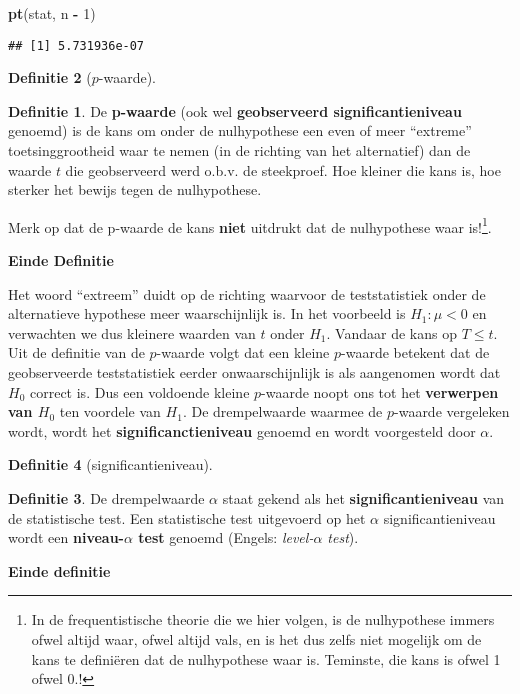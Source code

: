 \documentclass[
  12pt,dutch,coursenotes]{book}
\newenvironment{Shaded}{\begin{snugshade}}{\end{snugshade}}
\newcommand{\DecValTok}[1]{\textcolor[rgb]{0.00,0.00,0.81}{#1}}
\newcommand{\KeywordTok}[1]{\textcolor[rgb]{0.13,0.29,0.53}{\textbf{#1}}}
\newcommand{\NormalTok}[1]{#1}
\newcommand{\OperatorTok}[1]{\textcolor[rgb]{0.81,0.36,0.00}{\textbf{#1}}}
\newcommand{\StringTok}[1]{\textcolor[rgb]{0.31,0.60,0.02}{#1}}
\theoremstyle{definition}
\newtheorem{definition}{Definitie}[chapter]
\theoremstyle{definition}
\theoremstyle{definition}
\theoremstyle{remark}
\begin{document}
\begin{Shaded}
\begin{Highlighting}[]
\KeywordTok{pt}\NormalTok{(stat, n }\OperatorTok{{-}}\StringTok{ }\DecValTok{1}\NormalTok{)}
\end{Highlighting}
\end{Shaded}

\begin{verbatim}
## [1] 5.731936e-07
\end{verbatim}

\begin{definition}[$p$-waarde]
\begin{definition}

\protect\hypertarget{def:unnamed-chunk-163}{}{\label{def:unnamed-chunk-163} \iffalse (\(p\)-waarde) \fi{} }De \textbf{p-waarde} (ook wel \textbf{geobserveerd significantieniveau} genoemd) is de
kans om onder de nulhypothese een even of meer ``extreme'' toetsinggrootheid
waar te nemen (in de richting van het alternatief) dan de waarde \(t\) die
geobserveerd werd o.b.v. de steekproef. Hoe kleiner die kans is, hoe sterker het bewijs tegen de
nulhypothese.

Merk op dat de p-waarde de kans \textbf{niet} uitdrukt dat de nulhypothese waar is!\footnote{In de frequentistische theorie die we hier volgen, is de nulhypothese immers ofwel altijd waar, ofwel altijd vals, en is het dus zelfs niet mogelijk om de kans te definiëren dat de nulhypothese waar is. Teminste, die kans is ofwel 1 ofwel 0.!}.

\textbf{Einde Definitie}

\end{definition}
\end{definition}

Het woord ``extreem'' duidt op de richting waarvoor de teststatistiek onder de alternatieve hypothese meer waarschijnlijk is. In het voorbeeld is \(H_1: \mu < 0\) en verwachten we dus kleinere waarden van \(t\) onder \(H_1\). Vandaar de kans op \(T\leq t\).
Uit de definitie van de \(p\)-waarde volgt dat een kleine \(p\)-waarde betekent dat de geobserveerde teststatistiek eerder onwaarschijnlijk is als aangenomen wordt dat \(H_0\) correct is.
Dus een voldoende kleine \(p\)-waarde noopt ons tot het \textbf{verwerpen van \(H_0\)} ten voordele van \(H_1\).
De drempelwaarde waarmee de \(p\)-waarde vergeleken wordt, wordt het \textbf{significanctieniveau} genoemd en wordt voorgesteld door \(\alpha\).

\begin{definition}[significantieniveau]
\begin{definition}

\protect\hypertarget{def:unnamed-chunk-164}{}{\label{def:unnamed-chunk-164} \iffalse (significantieniveau) \fi{} }De drempelwaarde \(\alpha\) staat gekend als het \textbf{significantieniveau} van de statistische test. Een statistische test uitgevoerd op het \(\alpha\) significantieniveau wordt een \textbf{niveau-\(\alpha\) test} genoemd (Engels: \emph{level-\(\alpha\) test}).

\textbf{Einde definitie}

\end{definition}
\end{definition}
\end{document}
